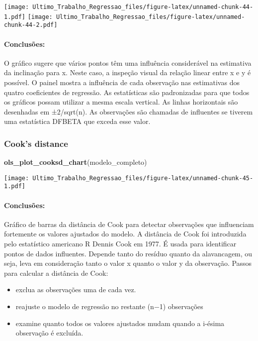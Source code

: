 \documentclass[
]{article}
\newenvironment{Shaded}{\begin{snugshade}}{\end{snugshade}}
\newcommand{\FunctionTok}[1]{\textcolor[rgb]{0.13,0.29,0.53}{\textbf{#1}}}
\newcommand{\NormalTok}[1]{#1}
\providecommand{\tightlist}{%
  \setlength{\itemsep}{0pt}\setlength{\parskip}{0pt}}
\begin{document}
\texttt{[image: Ultimo\_Trabalho\_Regressao\_files/figure-latex/unnamed-chunk-44-1.pdf]}
\texttt{[image: Ultimo\_Trabalho\_Regressao\_files/figure-latex/unnamed-chunk-44-2.pdf]}

\hypertarget{conclusuxf5es-8}{%
\paragraph{Conclusões:}\label{conclusuxf5es-8}}

O gráfico sugere que vários pontos têm uma influência considerável na
estimativa da inclinação para x. Neste caso, a inspeção visual da
relação linear entre x e y é possível. O painel mostra a influência de
cada observação nas estimativas dos quatro coeficientes de regressão. As
estatísticas são padronizadas para que todos os gráficos possam utilizar
a mesma escala vertical. As linhas horizontais são desenhadas em
±2/sqrt(n). As observações são chamadas de influentes se tiverem uma
estatística DFBETA que exceda esse valor.

\hypertarget{cooks-distance}{%
\subsubsection{Cook's distance}\label{cooks-distance}}

\begin{Shaded}
\begin{Highlighting}[]
\FunctionTok{ols\_plot\_cooksd\_chart}\NormalTok{(modelo\_completo)}
\end{Highlighting}
\end{Shaded}

\texttt{[image: Ultimo\_Trabalho\_Regressao\_files/figure-latex/unnamed-chunk-45-1.pdf]}

\hypertarget{conclusuxf5es-9}{%
\paragraph{Conclusões:}\label{conclusuxf5es-9}}

Gráfico de barras da distância de Cook para detectar observações que
influenciam fortemente os valores ajustados do modelo. A distância de
Cook foi introduzida pelo estatístico americano R Dennis Cook em 1977. É
usada para identificar pontos de dados influentes. Depende tanto do
resíduo quanto da alavancagem, ou seja, leva em consideração tanto o
valor x quanto o valor y da observação. Passos para calcular a distância
de Cook:

\begin{itemize}
\tightlist
\item
  exclua as observações uma de cada vez.
\item
  reajuste o modelo de regressão no restante (n−1) observações
\item
  examine quanto todos os valores ajustados mudam quando a i-ésima
  observação é excluída.
\end{itemize}
\end{document}
